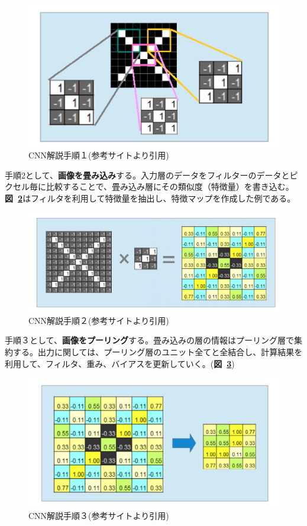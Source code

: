 \documentclass[a4paper, 11pt, titlepage]{jsarticle}
\begin{document}
\begin{figure}[h]
  \centering
  \includegraphics[scale=0.4]{cnn1.png}
  \caption{CNN解説手順１(参考サイト\cite{cnn}より引用)}
  \label{cnn1}
\end{figure}


手順2として、\textbf{画像を畳み込み}する。入力層のデータをフィルターのデータとピクセル毎に比較することで、畳み込み層にその類似度（特徴量）を書き込む。\textbf{図~\ref{cnn2}}はフィルタを利用して特徴量を抽出し、特徴マップを作成した例である。

\begin{figure}[h]
  \centering
  \includegraphics[scale=0.3]{cnn2.png}
  \caption{CNN解説手順２(参考サイト\cite{cnn}より引用)}
  \label{cnn2}
\end{figure}

手順３として、\textbf{画像をプーリング}する。畳み込みの層の情報はプーリング層で集約する。出力に関しては、プーリング層のユニット全てと全結合し、計算結果を利用して、フィルタ、重み、バイアスを更新していく。(\textbf{図~\ref{cnn3}})

\begin{figure}[h]
  \centering
  \includegraphics[scale=0.3]{cnn3.png}
  \caption{CNN解説手順３(参考サイト\cite{cnn}より引用)}
  \label{cnn3}
\end{figure}
\end{document}
